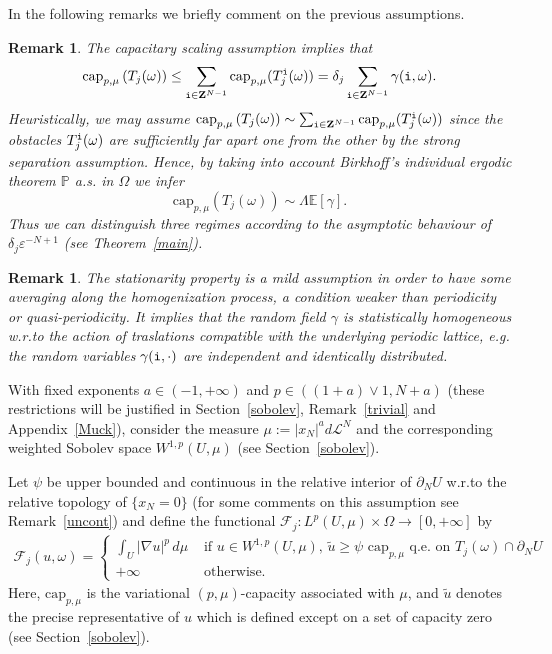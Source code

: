 \documentclass[10pt,reqno]{amsart}
\numberwithin{equation}{section}
\def\L{{\mathcal L}}
\def\Z{{\bf Z}}
\def\FFepsi{{\mathcal F}_{j}}
\def\ii{{\tt i}}
\def\e{\varepsilon}
\def\Wsp{W^{1,p}}
\def\capmu{\mathrm{cap}_{p,\mu}}
\def\Om{\Omega}
\def\om{\omega}
\def\deltae{\delta_{j}}
\def\Teioe{T_{j}^\ii(\om)}
\def\Teio{T_{j}^\ii(\om)}
\def\Teoe{T_{j}(\om)}
\def\gammaio{\gamma(\ii,\om)}
\def\Ieps{{\mathcal I}_j}
\def\tildeu{\tilde{u}}
\def\mmu{\mathbb{P}}
\def\xn{x_N}
\def\UU{\partial_NU}
\newtheorem{remark}[theorem]{Remark}
\begin{document}
In the following remarks we briefly comment on the previous assumptions.

\begin{remark}
The capacitary scaling assumption implies that
$$
\capmu\left(\Teoe\right)\leq\sum_{\ii\in\Z^{N-1}}\capmu(\Teioe)=
\deltae\sum_{\ii\in\Z^{N-1}}\gammaio.
$$
Heuristically, %
we may assume $\capmu\left(\Teoe\right)\sim\sum_{\ii\in\Z^{N-1}}\capmu(\Teioe)$
since the obstacles $\Teioe$ are sufficiently far apart one from
the other by the strong separation assumption.
Hence, by taking into account Birkhoff's individual ergodic theorem
$\mmu$ a.s. in $\Om$ we infer
$$
\capmu\left(\Teoe\right)\sim\Lambda\mathbb{E}[\gamma].
$$
Thus we can distinguish three regimes according to the asymptotic
behaviour of $\deltae\e^{-N+1}$ (see Theorem~\ref{main}).
\end{remark}

\begin{remark}
The stationarity %
property is a mild assumption in order to have some averaging along the
homogenization process, a condition weaker than periodicity or 
quasi-periodicity. 
It implies that the random field $\gamma$ is statistically 
homogeneous w.r.to the action of traslations compatible with the 
underlying periodic lattice, e.g. the random variables 
$\gamma(\ii,\cdot)$ are independent and identically distributed. 
\end{remark}

With fixed exponents $a\in(-1,+\infty)$ and $p\in((1+a)\vee 1,N+a)$
(these restrictions will be justified in Section~\ref{sobolev},
Remark~\ref{trivial} and Appendix~\ref{Muck}), consider the measure
$\mu:=|\xn|^ad\L^N$ and the corresponding weighted Sobolev space
$\Wsp(U,\mu)$ (see Section~\ref{sobolev}).

Let $\psi$ be upper bounded and continuous in the relative interior of $\UU$
w.r.to the relative topology of $\{\xn=0\}$ (for some comments on this 
assumption see Remark~\ref{uncont}) and define the functional 
$\FFepsi:L^p(U,\mu)\times\Om\to[0,+\infty]$ by
\begin{eqnarray}  \label{eq:fapprox}
  \FFepsi(u,\om)=
  \begin{cases}
\displaystyle{\int_U|\nabla u|^p\,d\mu} &
\text{ if } u\in \Wsp(U,\mu),\,
\tildeu\geq\psi\,\,  \capmu \text{ q.e. on } \Teoe\cap\UU\\
+\infty & \text{ otherwise. }
  \end{cases}
\end{eqnarray}
Here, $\capmu$ is the variational $(p,\mu)$-capacity associated with $\mu$,
and $\tilde{u}$ denotes the precise representative of $u$ which
is defined except on a set of capacity zero (see Section~\ref{sobolev}).
\end{document}
